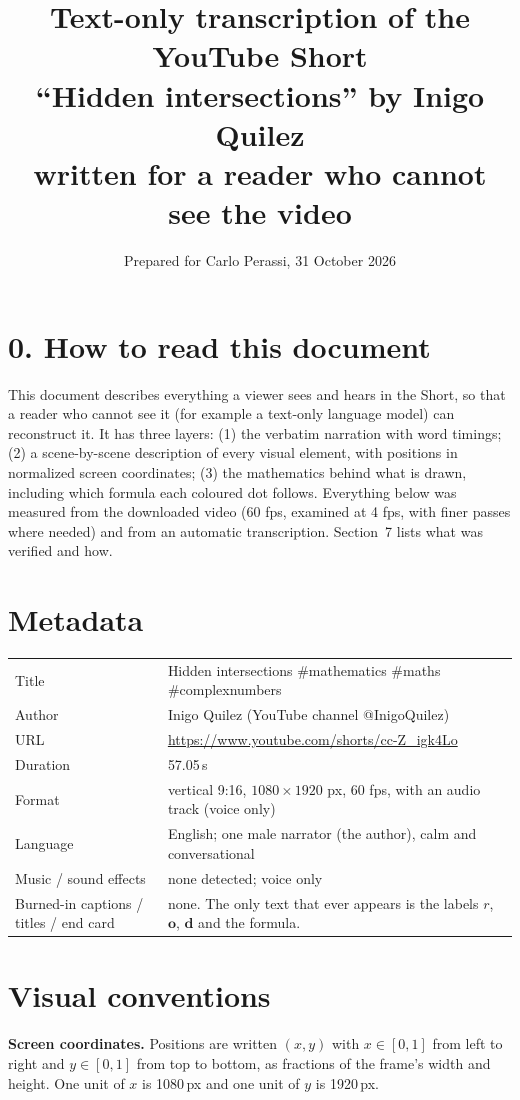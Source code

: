 \documentclass[10pt,a4paper]{article}
\title{Text-only transcription of the YouTube Short\\``Hidden intersections'' by Inigo Quilez\\[2pt]\large written for a reader who cannot see the video}
\author{Prepared for Carlo Perassi, 31 October 2026}
\date{}
\newcommand{\vo}{\mathbf{o}}\newcommand{\vd}{\mathbf{d}}\newcommand{\vp}{\mathbf{p}}
\begin{document}
\maketitle

\section*{0. How to read this document}
This document describes everything a viewer sees and hears in the Short, so that a reader who cannot see it (for example a text-only language model) can reconstruct it. It has three layers:
(1) the verbatim narration with word timings;
(2) a scene-by-scene description of every visual element, with positions in normalized screen coordinates;
(3) the mathematics behind what is drawn, including which formula each coloured dot follows.
Everything below was measured from the downloaded video (60 fps, examined at 4 fps, with finer passes where needed) and from an automatic transcription. Section~7 lists what was verified and how.

\section{Metadata}
\begin{tabular}{@{}p{42mm}p{125mm}@{}}
Title & Hidden intersections \#mathematics \#maths \#complexnumbers\\
Author & Inigo Quilez (YouTube channel @InigoQuilez)\\
URL & \url{https://www.youtube.com/shorts/cc-Z_igk4Lo}\\
Duration & 57.05\,s\\
Format & vertical 9:16, $1080\times1920$ px, 60 fps, with an audio track (voice only)\\
Language & English; one male narrator (the author), calm and conversational\\
Music / sound effects & none detected; voice only\\
Burned-in captions / titles / end card & none. The only text that ever appears is the labels $r$, $\vo$, $\vd$ and the formula.\\
\end{tabular}

\section{Visual conventions}
\textbf{Screen coordinates.} Positions are written $(x,y)$ with $x\in[0,1]$ from left to right and $y\in[0,1]$ from top to bottom, as fractions of the frame's width and height. One unit of $x$ is 1080\,px and one unit of $y$ is 1920\,px.
\end{document}
